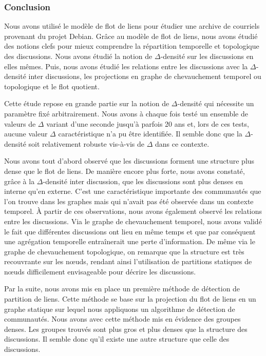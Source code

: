 \subsubsection{Conclusion}

Nous avons utilisé le modèle de flot de liens pour étudier une archive de courriels provenant du projet Debian.
Grâce au modèle de flot de liens, nous avons étudié des notions clefs pour mieux comprendre la répartition temporelle et topologique des discussions.
Nous avons étudié la notion de $\Delta$-densité sur les discussions en elles mêmes.
Puis, nous avons étudié les relations entre les discussions avec la $\Delta$-densité inter discussions, les projections en graphe de chevauchement temporel ou topologique et le flot quotient.

Cette étude repose en grande partie sur la notion de $\Delta$-densité qui nécessite un paramètre fixé arbitrairement.
Nous avons à chaque fois testé un ensemble de valeurs de $\Delta$ variant d'une seconde jusqu'à parfois 20 ans et, lors de ces tests, aucune valeur $\Delta$ caractéristique n'a pu être identifiée.
Il semble donc que la $\Delta$-densité soit relativement robuste vis-à-vis de $\Delta$ dans ce contexte.

Nous avons tout d'abord observé que les discussions forment une structure plus dense que le flot de liens.
De manière encore plus forte, nous avons constaté, grâce à la  $\Delta$-densité inter discussion, que les discussions sont plus denses en interne qu'en externe.
C'est une caractéristique importante des communautés que l'on trouve dans les graphes mais qui n'avait pas été observée dans un contexte temporel.
\`A partir de ces observations, nous avons également observé les relations entre les discussions.
Via le graphe de chevauchement temporel, nous avons validé le fait que différentes discussions ont lieu en même temps et que par conséquent une agrégation temporelle entraînerait une perte d'information.
De même via le graphe de chevauchement topologique, on remarque que la structure est très recouvrante sur les n\oe{}uds, rendant ainsi l'utilisation de partitions statiques de n\oe{}uds difficilement envisageable pour décrire les discussions.


Par la suite, nous avons mis en place un première méthode de détection de partition de liens.
Cette méthode se base sur la projection du flot de liens en un graphe statique sur lequel nous appliquons un algorithme de détection de communautés.
Nous avons avec cette méthode mis en évidence des groupes denses.
Les groupes trouvés sont plus gros et plus denses que la structure des discussions.
Il semble donc qu'il existe une autre structure que celle des discussions.

